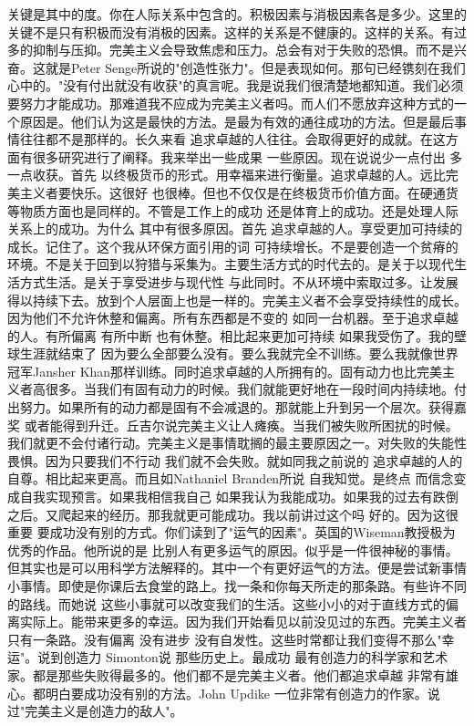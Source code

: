 关键是其中的度。你在人际关系中包含的。积极因素与消极因素各是多少。这里的关键不是只有积极而没有消极的因素。这样的关系是不健康的。这样的关系。有过多的抑制与压抑。完美主义会导致焦虑和压力。总会有对于失败的恐惧。而不是兴奋。这就是Peter Senge所说的"创造性张力"。但是表现如何。那句已经镌刻在我们心中的。"没有付出就没有收获"的真言呢。我是说我们很清楚地都知道。我们必须要努力才能成功。那难道我不应成为完美主义者吗。而人们不愿放弃这种方式的一个原因是。他们认为这是最快的方法。是最为有效的通往成功的方法。但是最后事情往往都不是那样的。长久来看 追求卓越的人往往。会取得更好的成就。在这方面有很多研究进行了阐释。我来举出一些成果 一些原因。现在说说少一点付出 多一点收获。首先 以终极货币的形式。用幸福来进行衡量。追求卓越的人。远比完美主义者要快乐。这很好 也很棒。但也不仅仅是在终极货币价值方面。在硬通货等物质方面也是同样的。不管是工作上的成功 还是体育上的成功。还是处理人际关系上的成功。为什么 其中有很多原因。首先 追求卓越的人。享受更加可持续的成长。记住了。这个我从环保方面引用的词 可持续增长。不是要创造一个贫瘠的环境。不是关于回到以狩猎与采集为。主要生活方式的时代去的。是关于以现代生活方式生活。是关于享受进步与现代性 与此同时。不从环境中索取过多。让发展得以持续下去。放到个人层面上也是一样的。完美主义者不会享受持续性的成长。因为他们不允许休整和偏离。所有东西都是不变的 如同一台机器。至于追求卓越的人。有所偏离 有所中断 也有休整。相比起来更加可持续 如果我受伤了。我的壁球生涯就结束了 因为要么全部要么没有。要么我就完全不训练。要么我就像世界冠军Jansher Khan那样训练。同时追求卓越的人所拥有的。固有动力也比完美主义者高很多。当我们有固有动力的时候。我们就能更好地在一段时间内持续地。付出努力。如果所有的动力都是固有不会减退的。那就能上升到另一个层次。获得嘉奖 或者能得到升迁。丘吉尔说完美主义让人瘫痪。当我们被失败所困扰的时候。我们就更不会付诸行动。完美主义是事情耽搁的最主要原因之一。对失败的失能性畏惧。因为只要我们不行动 我们就不会失败。就如同我之前说的 追求卓越的人的自尊。相比起来更高。而且如Nathaniel Branden所说 自我知觉。是终点 而信念变成自我实现预言。如果我相信我自己 如果我认为我能成功。如果我的过去有跌倒之后。又爬起来的经历。那我就更可能成功。我以前讲过这个吗 好的。因为这很重要 要成功没有别的方式。你们读到了"运气的因素"。英国的Wiseman教授极为优秀的作品。他所说的是 比别人有更多运气的原因。似乎是一件很神秘的事情。但其实也是可以用科学方法解释的。其中一个有更好运气的方法。便是尝试新事情 小事情。即使是你课后去食堂的路上。找一条和你每天所走的那条路。有些许不同的路线。而她说 这些小事就可以改变我们的生活。这些小小的对于直线方式的偏离实际上。能带来更多的幸运。因为我们开始看见以前没见过的东西。完美主义者 只有一条路。没有偏离 没有进步 没有自发性。这些时常都让我们变得不那么"幸运"。说到创造力 Simonton说 那些历史上。最成功 最有创造力的科学家和艺术家。都是那些失败得最多的。他们都不是完美主义者。他们都追求卓越 非常有雄心。都明白要成功没有别的方法。John Updike 一位非常有创造力的作家。说过"完美主义是创造力的敌人"。 

